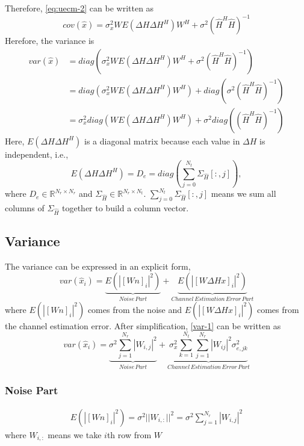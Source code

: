 \documentclass{article}
\begin{document}
Therefore, \eqref{eq:uecm-2} can be written as 
\begin{equation}
cov(\hat{x}) = \sigma_x^2WE(\Delta H\Delta H^H)W^H + \sigma^2(\hat{H}^H\hat{H})^{-1}
\end{equation}
Herefore, the variance is 
\begin{equation}
\begin{split}
var(\hat{x}) &= diag(\sigma_x^2WE(\Delta H\Delta H^H)W^H + \sigma^2(\hat{H}^H\hat{H})^{-1}) \\
&= diag(\sigma_x^2WE(\Delta H\Delta H^H)W^H) + diag(\sigma^2(\hat{H}^H\hat{H})^{-1}) \\
&= \sigma_x^2diag(WE(\Delta H\Delta H^H)W^H) + \sigma^2diag((\hat{H}^H\hat{H})^{-1})
\end{split}
\end{equation} 
Here, $E(\Delta H\Delta H^H)$ is a diagonal matrix because each value in $\Delta H$ is independent, i.e.,
\begin{equation}
E(\Delta H\Delta H^H) = D_e = diag(\sum_{j=0}^{N_t}\Sigma_{\hat{H}}[:, j]),
\end{equation}
where $D_e\in \mathbb{R}^{N_r \times N_r}$ and $\Sigma_{\hat{H}}\in \mathbb{R}^{N_r \times N_t}$. $\sum_{j=0}^{N_t}\Sigma_{\hat{H}}[:, j]$ means we sum all columns of $\Sigma_{\hat{H}}$ together to build a column vector.

\subsection{Variance}
The variance can be expressed in an explicit form,
\begin{equation}
var(\hat{x}_i) = \underbrace{E(|[Wn]_i|^2)}_{Noise\,Part} + \underbrace{E(|[W\Delta Hx]_i|^2)}_{Channel\,Estimation\,Error\,Part}
\label{var-1}
\end{equation}
where $E(|[Wn]_i|^2)$ comes from the noise and $E(|[W\Delta Hx]_i|^2)$ comes from the channel estimation error.
After simplification, \eqref{var-1} can be written as
\begin{equation}
var(\hat{x}_i) = \underbrace{\sigma^2\sum_{j=1}^{N_r}|W_{i,j}|^2}_{Noise\,Part} + \underbrace{\sigma_x^2 \sum_{k=1}^{N_t} \sum_{j=1}^{N_r}|W_{ij}|^2 \sigma_{e,jk}^2}_{Channel\,Estimation\,Error\,Part}
\end{equation}
\subsubsection{Noise Part}
\begin{equation}
\begin{split}
E(|[Wn]_i|^2) = \sigma^2||W_{i,:}||^2 = \sigma^2\sum_{j=1}^{N_r}|W_{i,j}|^2 
\end{split}
\end{equation}
where $W_{i,:}$ means we take $i$th row from $W$ 
\end{document}
